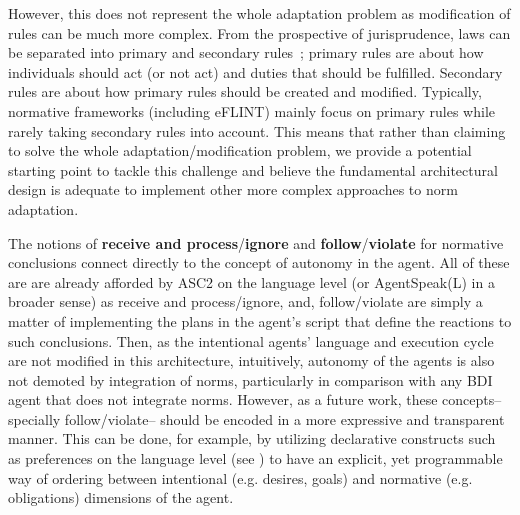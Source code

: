However, this does not represent the whole adaptation problem as modification of rules can be much more complex. From the prospective of jurisprudence, laws can be separated into primary and secondary rules~\cite{hart2012concept}; primary rules are about how individuals should act (or not act) and duties that should be fulfilled. Secondary rules are about how primary rules should be created and modified. Typically, normative frameworks (including eFLINT) mainly focus on primary rules while rarely taking secondary rules into account. This means that rather than claiming to solve the whole adaptation/modification problem, we provide a potential starting point to tackle this challenge and believe the fundamental architectural design is adequate to implement other more complex approaches to norm adaptation.



The notions of \textbf{receive and process}/\textbf{ignore} and \textbf{follow}/\textbf{violate} for normative conclusions connect directly to the concept of autonomy in the agent. All of these are are already afforded by ASC2 on the language level (or AgentSpeak(L) in a broader sense) as receive and process/ignore, and, follow/violate are simply a matter of implementing the plans in the agent's script that define the reactions to such conclusions. Then, as the intentional agents' language and execution cycle are not modified in this architecture, intuitively, autonomy of the agents is also not demoted by integration of norms, particularly in comparison with any BDI agent that does not integrate norms. However, as a future work, these concepts-- specially follow/violate-- should be encoded in a more expressive and transparent manner. This can be done, for example, by utilizing declarative constructs such as preferences on the language level (see \cite{Mohajeriparizi2022Preference}) to have an explicit, yet programmable way of ordering between intentional (e.g. desires, goals) and normative (e.g. obligations) dimensions of the agent.



